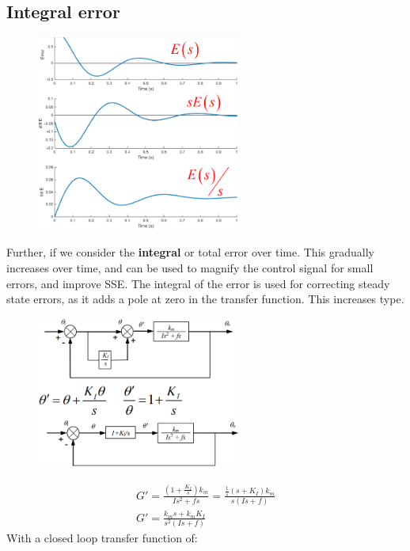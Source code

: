 \documentclass[class=report, crop=false, 12pt,a4paper]{standalone}
\begin{document}
\subsection{Integral error}
\begin{figure}[H]
  \centerline{\includegraphics[width = 0.6\textwidth]{../img/diagram126.png}}
  \caption{}
\end{figure}
Further, if we consider the \textbf{integral} or total error over time. This gradually increases over time, and can be used to magnify the control signal for small errors, and improve SSE. The integral of the error is used for correcting steady state errors, as it adds a pole at zero in the transfer function. This increases type.
\begin{figure}[H]
  \centerline{\includegraphics[width = 0.6\textwidth]{../img/diagram127.png}}
  \caption{}
\end{figure}
\begin{gather}
  G' = \frac{\left(1 + \frac{K_I}{s}\right) k_m}{Is^2 + fs} = \frac{\frac{1}{s} \left(s + K_I \right)k_m}{s \left(Is + f\right)}\\
  G' = \frac{k_m s + k_m K_I}{s^2 \left(Is + f\right)}
\end{gather}
With a closed loop transfer function of:
\end{document}
